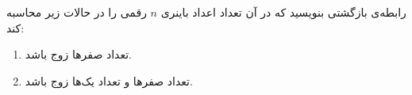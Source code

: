     \p 
رابطه‌ی بازگشتی بنویسید که در آن تعداد اعداد باینری
$n$
رقمی را در حالات زیر محاسبه کند:
\begin{enumerate}
\item
تعداد صفرها زوج باشد.
\item
تعداد صفرها و تعداد یک‌ها زوج باشد.
\end{enumerate}
